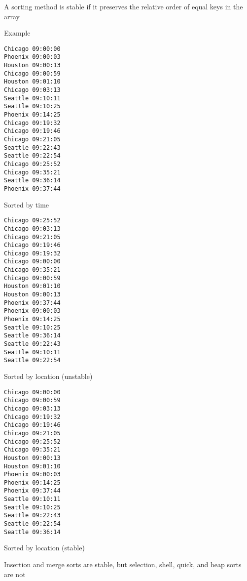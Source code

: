 \documentclass[8pt,a4paper,compress]{beamer}
\begin{document}
\begin{frame}[fragile]
\pause

A sorting method is stable if it preserves the relative order of equal keys in the array

\pause
\bigskip

Example

\begin{minipage}{65pt}
\begin{lstlisting}[language={},backgroundcolor=\color{white}]
Chicago 09:00:00
Phoenix 09:00:03
Houston 09:00:13
Chicago 09:00:59
Houston 09:01:10
Chicago 09:03:13
Seattle 09:10:11
Seattle 09:10:25
Phoenix 09:14:25
Chicago 09:19:32
Chicago 09:19:46
Chicago 09:21:05
Seattle 09:22:43
Seattle 09:22:54
Chicago 09:25:52
Chicago 09:35:21
Seattle 09:36:14
Phoenix 09:37:44
\end{lstlisting}
\begin{center}
\tiny Sorted by time
\end{center}
\end{minipage}\hfill
\begin{minipage}{65pt}
\begin{lstlisting}[language={},backgroundcolor=\color{white}]
Chicago 09:25:52
Chicago 09:03:13
Chicago 09:21:05
Chicago 09:19:46
Chicago 09:19:32
Chicago 09:00:00
Chicago 09:35:21
Chicago 09:00:59
Houston 09:01:10
Houston 09:00:13
Phoenix 09:37:44
Phoenix 09:00:03
Phoenix 09:14:25
Seattle 09:10:25
Seattle 09:36:14
Seattle 09:22:43
Seattle 09:10:11
Seattle 09:22:54
\end{lstlisting}
\begin{center}
\tiny Sorted by location (unstable)
\end{center}
\end{minipage}\hfill
\begin{minipage}{65pt}
\begin{lstlisting}[language={},backgroundcolor=\color{white}]
Chicago 09:00:00
Chicago 09:00:59
Chicago 09:03:13
Chicago 09:19:32
Chicago 09:19:46
Chicago 09:21:05
Chicago 09:25:52
Chicago 09:35:21
Houston 09:00:13
Houston 09:01:10
Phoenix 09:00:03
Phoenix 09:14:25
Phoenix 09:37:44
Seattle 09:10:11
Seattle 09:10:25
Seattle 09:22:43
Seattle 09:22:54
Seattle 09:36:14
\end{lstlisting}
\begin{center}
\tiny Sorted by location (stable)
\end{center}
\end{minipage}

\pause
\bigskip

Insertion and merge sorts are stable, but selection, shell, quick, and heap sorts are not
\end{frame}
\end{document}
